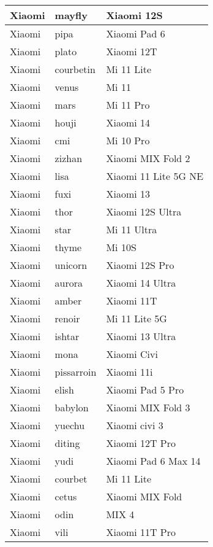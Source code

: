 \begin{tabularx}{\linewidth}{|l|X|X|}
        Xiaomi & mayfly & Xiaomi 12S \\ \hline
        Xiaomi & pipa & Xiaomi Pad 6 \\ \hline
        Xiaomi & plato & Xiaomi 12T \\ \hline
        Xiaomi & courbetin & Mi 11 Lite \\ \hline
        Xiaomi & venus & Mi 11 \\ \hline
        Xiaomi & mars & Mi 11 Pro \\ \hline
        Xiaomi & houji & Xiaomi 14 \\ \hline
        Xiaomi & cmi & Mi 10 Pro \\ \hline
        Xiaomi & zizhan & Xiaomi MIX Fold 2 \\ \hline
        Xiaomi & lisa & Xiaomi 11 Lite 5G NE \\ \hline
        Xiaomi & fuxi & Xiaomi 13 \\ \hline
        Xiaomi & thor & Xiaomi 12S Ultra \\ \hline
        Xiaomi & star & Mi 11 Ultra \\ \hline
        Xiaomi & thyme & Mi 10S \\ \hline
        Xiaomi & unicorn & Xiaomi 12S Pro \\ \hline
        Xiaomi & aurora & Xiaomi 14 Ultra \\ \hline
        Xiaomi & amber & Xiaomi 11T \\ \hline
        Xiaomi & renoir & Mi 11 Lite 5G \\ \hline
        Xiaomi & ishtar & Xiaomi 13 Ultra \\ \hline
        Xiaomi & mona & Xiaomi Civi \\ \hline
        Xiaomi & pissarroin & Xiaomi 11i \\ \hline
        Xiaomi & elish & Xiaomi Pad 5 Pro \\ \hline
        Xiaomi & babylon & Xiaomi MIX Fold 3 \\ \hline
        Xiaomi & yuechu & Xiaomi civi 3 \\ \hline
        Xiaomi & diting & Xiaomi 12T Pro \\ \hline
        Xiaomi & yudi & Xiaomi Pad 6 Max 14 \\ \hline
        Xiaomi & courbet & Mi 11 Lite \\ \hline
        Xiaomi & cetus & Xiaomi MIX Fold \\ \hline
        Xiaomi & odin & MIX 4 \\ \hline
        Xiaomi & vili & Xiaomi 11T Pro \\ \hline

\end{tabularx}
